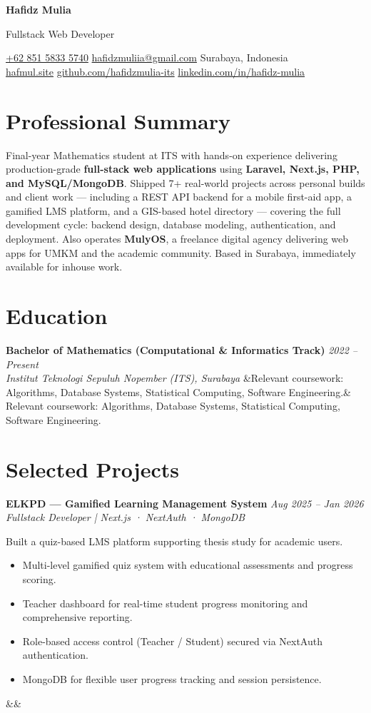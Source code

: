 \documentclass[a4paper,11pt]{article}
\newcommand{\cvname}[1]{%
  {\centering\LARGE\bfseries #1\par\vspace{2pt}}%
}
\newcommand{\cvtitle}[1]{%
  {\centering\large\color{accent} #1\par\vspace{4pt}}%
}
\newcommand{\cvcontact}[1]{%
  {\centering\small #1\par\vspace{6pt}}%
}
\newcommand{\cventry}[4]{%
  \noindent\textbf{#1} \hfill \textit{#3} \\
  \textit{#2}
  \ifx&#4& \else \\ \small #4 \fi
  \vspace{6pt}
}
\newcommand{\cvproject}[5]{%
  \noindent\textbf{#1} \hfill \textit{#2} \\
  \textit{\small #3} \\
  {\small #4}
  \ifx&#5& \else \par\noindent{\small \href{#5}{View Repository / Demo}} \fi
  \vspace{6pt}
}
\begin{document}
\cvname{Hafidz Mulia}
\cvtitle{Fullstack Web Developer}
\cvcontact{%
  \href{tel:+6285158335740}{+62 851 5833 5740} \quad\textbar\quad
  \href{mailto:hafidzmuliia@gmail.com}{hafidzmuliia@gmail.com} \quad\textbar\quad
  Surabaya, Indonesia \\
  \href{https://hafmul.site}{hafmul.site} \quad\textbar\quad
  \href{https://github.com/hafidzmulia-its}{github.com/hafidzmulia-its} \quad\textbar\quad
  \href{https://linkedin.com/in/hafidz-mulia}{linkedin.com/in/hafidz-mulia}
}

\section{Professional Summary}
Final-year Mathematics student at ITS with hands-on experience delivering production-grade \textbf{full-stack web applications} using \textbf{Laravel, Next.js, PHP, and MySQL/MongoDB}. Shipped 7+ real-world projects across personal builds and client work — including a REST API backend for a mobile first-aid app, a gamified LMS platform, and a GIS-based hotel directory — covering the full development cycle: backend design, database modeling, authentication, and deployment. Also operates \textbf{MulyOS}, a freelance digital agency delivering web apps for UMKM and the academic community. Based in Surabaya, immediately available for inhouse work.

\section{Education}
\cventry
  {Bachelor of Mathematics (Computational \& Informatics Track)}
  {Institut Teknologi Sepuluh Nopember (ITS), Surabaya}
  {2022 -- Present}
  {Relevant coursework: Algorithms, Database Systems, Statistical Computing, Software Engineering.}

\section{Selected Projects}

\cvproject
  {ELKPD --- Gamified Learning Management System}
  {Aug 2025 -- Jan 2026}
  {Fullstack Developer | Next.js · NextAuth · MongoDB}
  {Built a quiz-based LMS platform supporting thesis study for academic users.
  \begin{itemize}[leftmargin=15pt, nosep]
      \item Multi-level gamified quiz system with educational assessments and progress scoring.
      \item Teacher dashboard for real-time student progress monitoring and comprehensive reporting.
      \item Role-based access control (Teacher / Student) secured via NextAuth authentication.
      \item MongoDB for flexible user progress tracking and session persistence.
  \end{itemize}}
  {}
\end{document}
